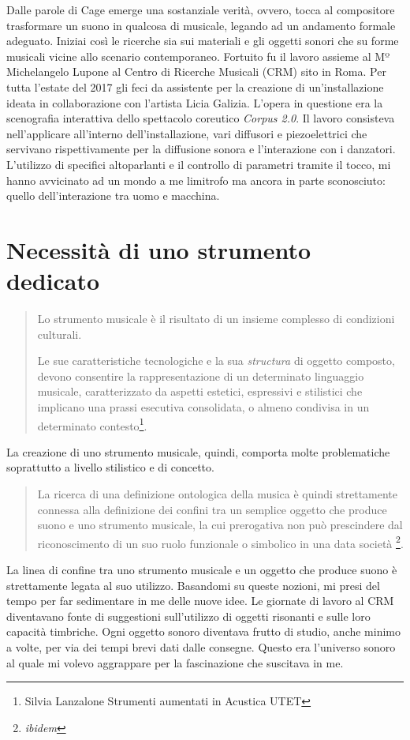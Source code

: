 Dalle parole di Cage emerge una sostanziale verità, ovvero, tocca al compositore trasformare un suono in qualcosa di musicale, legando ad un andamento formale adeguato. Iniziai così le ricerche sia sui materiali e gli oggetti sonori che su forme musicali vicine allo scenario contemporaneo. Fortuito fu il lavoro assieme al Mº Michelangelo Lupone al Centro di Ricerche Musicali (CRM) sito in Roma. Per tutta l'estate del 2017 gli feci da assistente per la creazione di un'installazione ideata in collaborazione con l'artista Licia Galizia. L'opera in questione era la scenografia interattiva dello spettacolo coreutico \textit{Corpus 2.0}. Il lavoro consisteva nell'applicare all'interno dell'installazione, vari diffusori e piezoelettrici che servivano rispettivamente per la diffusione sonora e l'interazione con i danzatori. L'utilizzo di specifici altoparlanti e il controllo di parametri tramite il tocco, mi hanno avvicinato ad un mondo a me limitrofo ma ancora in parte sconosciuto: quello dell'interazione tra uomo e macchina.

\section{Necessità di uno strumento dedicato}

\begin{small}
\begin{quotation}
Lo strumento musicale è il risultato di un insieme complesso di condizioni culturali.

Le sue caratteristiche tecnologiche e la sua \textit{structura} di oggetto composto, devono consentire la rappresentazione di un determinato linguaggio musicale, caratterizzato da aspetti estetici, espressivi e stilistici che implicano una prassi esecutiva consolidata, o almeno condivisa in un determinato contesto\footnote{Silvia Lanzalone Strumenti aumentati in Acustica UTET}.
\end{quotation}
\end{small}
La creazione di uno strumento musicale, quindi, comporta molte problematiche soprattutto a livello stilistico e di concetto. 
\begin{small}
\begin{quotation}
La ricerca di una definizione ontologica della musica è quindi strettamente connessa alla definizione dei confini tra un semplice oggetto che produce suono e uno strumento musicale, la cui prerogativa non può prescindere dal riconoscimento di un suo ruolo funzionale o simbolico in una data società
\footnote{\textit{ibidem}}.
\end{quotation}
\end{small}
La linea di confine tra uno strumento musicale e un oggetto che produce suono è strettamente legata al suo utilizzo. Basandomi su queste nozioni, mi presi del tempo per far sedimentare in me delle nuove idee. Le giornate di lavoro al CRM diventavano fonte di suggestioni sull'utilizzo di oggetti risonanti e sulle loro capacità timbriche. Ogni oggetto sonoro diventava frutto di studio, anche minimo a volte, per via dei tempi brevi dati dalle consegne. Questo era l'universo sonoro al quale mi volevo aggrappare per la fascinazione che suscitava in me.


